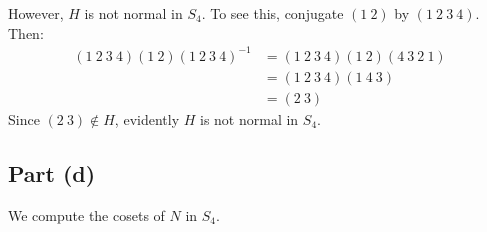 \documentclass{article}
\begin{document}
However, $H$ is not normal in $S_4$. To see this, conjugate $\left(1~2\right)$ by $\left(1~2~3~4\right)$. Then:
\begin{equation}
    \begin{split}
        \left(1~2~3~4\right)\left(1~2\right)\left(1~2~3~4\right)^{-1} & = \left(1~2~3~4\right)\left(1~2\right)\left(4~3~2~1\right) \\
        & = \left(1~2~3~4\right)\left(1~4~3\right) \\
        & = \left(2~3\right)
    \end{split}
\end{equation}
Since $\left(2~3\right) \not\in H$, evidently $H$ is not normal in $S_4$.
\subsection*{Part (d)}
We compute the cosets of $N$ in $S_4$.
\end{document}
